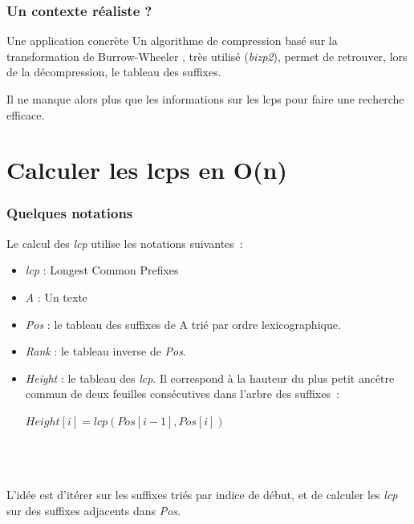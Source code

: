 \documentclass[10pt]{beamer}
\begin{document}
\begin{frame}
  \frametitle{Un contexte réaliste ?}
  
  \begin{block}{Une application concrète}
    Un algorithme de compression basé sur la transformation de
    Burrow-Wheeler \cite{Burrows94}, très utilisé (\emph{bizp2}), permet
    de retrouver, lors de la décompression, le tableau des suffixes. 
    
    Il ne manque alors plus que les informations sur les lcps pour faire
    une recherche efficace. 
  \end{block}

\end{frame}

\section{Calculer les lcps en O(n)}
\label{sec:algo}


\begin{frame}
  \frametitle{Quelques notations}

  Le calcul des \textit{lcp} utilise les notations suivantes~:
  \begin{itemize}
  \item \textit{lcp} : Longest Common Prefixes
  \item \textit{A} : Un texte
  \item \textit{Pos} : le tableau des suffixes de A trié par ordre
    lexicographique. 
  \item \textit{Rank} : le tableau inverse de \textit{Pos}.
  \item \textit{Height} : le tableau des \textit{lcp}. Il correspond à la
    hauteur du plus petit ancêtre commun de deux feuilles consécutives dans
    l'arbre des suffixes~:
    \begin{center}
    $\mathit{Height}[i] = \mathit{lcp}(\mathit{Pos}[i-1], \mathit{Pos}[i])$
    \end{center}
  \end{itemize}
  \hfill \\ \hfill \\ \hfill \\

  L'idée est d'itérer sur les suffixes triés par indice de début, et de
  calculer les \textit{lcp} sur des suffixes adjacents dans \textit{Pos}.
\end{frame}
\end{document}
